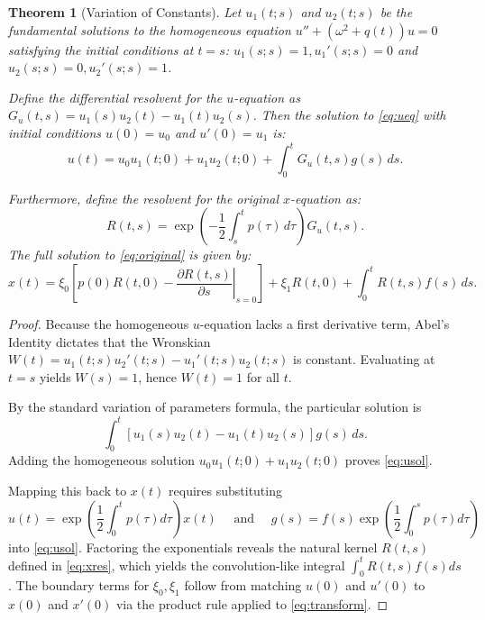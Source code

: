 \documentclass[10pt,reqno]{amsart}
\newtheorem{theorem}{Theorem}
\theoremstyle{definition}
\begin{document}
	\begin{theorem}[Variation of Constants]
		Let $u_1(t; s)$ and $u_2(t; s)$ be the fundamental solutions to the homogeneous equation $u'' + (\omega^2 + q(t))u = 0$ satisfying the initial conditions at $t=s$: $u_1(s; s)=1, u_1'(s; s)=0$ and $u_2(s; s)=0, u_2'(s; s)=1$. 
		
		Define the differential resolvent for the $u$-equation as $G_u(t, s) = u_1(s)u_2(t) - u_1(t)u_2(s)$. Then the solution to \eqref{eq:ueq} with initial conditions $u(0)=u_0$ and $u'(0)=u_1$ is:
		\begin{equation} \label{eq:usol}
			u(t) = u_0 u_1(t; 0) + u_1 u_2(t; 0) + \int_0^t G_u(t, s) g(s) \, ds.
		\end{equation}
		
		Furthermore, define the resolvent for the original $x$-equation as:
		\begin{equation} \label{eq:xres}
			R(t, s) = \exp\left(-\frac{1}{2}\int_s^t p(\tau) \, d\tau\right) G_u(t, s).
		\end{equation}
		The full solution to \eqref{eq:original} is given by:
		\begin{equation} \label{eq:xsol}
			x(t) = \xi_0 \left[ p(0)R(t, 0) - \left. \frac{\partial R(t, s)}{\partial s} \right|_{s=0} \right] + \xi_1 R(t, 0) + \int_0^t R(t, s)f(s) \, ds.
		\end{equation}
	\end{theorem}
	
	\begin{proof}
		Because the homogeneous $u$-equation lacks a first derivative term, Abel's Identity dictates that the Wronskian $W(t) = u_1(t; s)u_2'(t; s) - u_1'(t; s)u_2(t; s)$ is constant. Evaluating at $t=s$ yields $W(s) = 1$, hence $W(t) = 1$ for all $t$. 
		
		By the standard variation of parameters formula, the particular solution is $$\int_0^t [u_1(s)u_2(t) - u_1(t)u_2(s)] g(s) \, ds.$$ Adding the homogeneous solution $u_0 u_1(t; 0) + u_1 u_2(t; 0)$ proves \eqref{eq:usol}.
		
		Mapping this back to $x(t)$ requires substituting $$u(t) = \exp\left(\frac{1}{2}\int_0^t p(\tau)d\tau\right) x(t) \quad \text{ and } \quad g(s) = f(s)\exp\left(\frac{1}{2}\int_0^s p(\tau)d\tau\right)$$ into \eqref{eq:usol}. Factoring the exponentials reveals the natural kernel $R(t, s)$ defined in \eqref{eq:xres}, which yields the convolution-like integral $\int_0^t R(t,s)f(s)ds$. The boundary terms for $\xi_0, \xi_1$ follow from matching $u(0)$ and $u'(0)$ to $x(0)$ and $x'(0)$ via the product rule applied to \eqref{eq:transform}.
	\end{proof}
	
\end{document}
